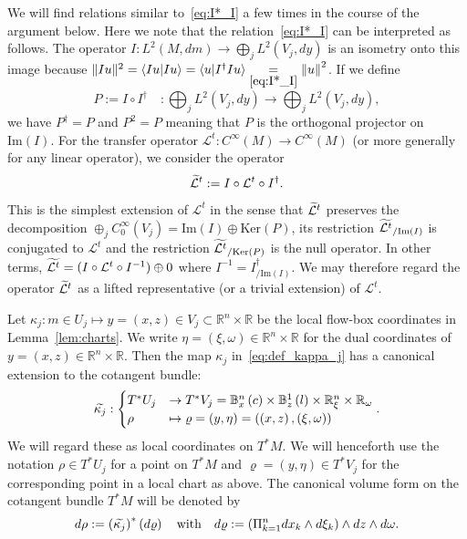\documentclass[AHL,Unicode,longabstracts,published]{cedram}
\newcommand{\clL}{\mathcal{L}}
\newcommand{\Imm}{\mathrm{Im}}
\newcommand{\Kerr}{\mathrm{Ker}}
\newcommand{\bbR}{\mathbb{R}}
\newcommand{\bbB}{\mathbb{B}}
\let\oldtilde\tilde
\renewcommand*{\tilde}[1]{\mathchoice{\widetilde{#1}}{\widetilde{#1}}{\oldtilde{#1}}{\oldtilde{#1}}}
\newcommand{\Imm}{\mathrm{Im}}
\newcommand{\bbR}{\mathbb{R}}
\begin{document}
\begin{rema}\label{rem:Projection}
We will find relations similar to~\eqref{eq:I*_I} a few times in the course of the argument below. Here we note that the relation~\eqref{eq:I*_I} can be interpreted as follows. The operator $I:L^{2}(M,dm)\rightarrow\bigoplus_{j}L^{2}(V_{j},dy)$ is an isometry onto this image because $\Vert Iu\Vert ^{2}=\langle Iu|Iu\rangle=\langle u|I^{\dagger}Iu\rangle\underset{\eqref{eq:I*_I}}{=}\left\Vert u\right\Vert ^{2}$. If we define
\[
P:=I\circ I^{\dagger}\quad:\bigoplus_{j}L^{2}\left(V_{j},dy\right)\rightarrow\bigoplus_{j}L^{2}\left(V_{j},dy\right),
\]
we have $P^{\dagger}=P$ and $P^{2}=P$ meaning that $P$ is the orthogonal projector on $\Imm(I)$. For the transfer operator $\clL^{t}:C^{\infty}(M)\rightarrow C^{\infty}(M)$ (or more generally for any linear operator), we consider the operator
\[
\tilde{\clL}^{t}:=I\circ\clL^{t}\circ I^{\dagger}.
\]
This is the simplest extension of $\clL^{t}$ in the sense that $\tilde{\clL}^{t}$ preserves the decomposition $\oplus_{j}C_{0}^{\infty}(V_{j})=\Imm(I)\oplus\Kerr(P)$, its restriction $\tilde{\clL^{t}}_{/\Imm(I)}$ is conjugated to $\clL^{t}$ and the restriction $\tilde{\clL^{t}}_{/\Kerr(P)}$ is the null operator. In other terms, $\tilde{\clL^{t}}=(I\circ\clL^{t}\circ I^{-1})\oplus0$ where $I^{-1}=I_{/\Imm(I)}^{\dagger}$. We may therefore regard the operator $\tilde{\clL}^{t}$ as a lifted representative (or a trivial extension) of $\clL^{t}$.
\end{rema}

\begin{defi}\label{def:local_charts_on_T*M}
Let $\kappa_{j}:m\in U_{j}\mapsto y=(x,z)\in V_{j}\subset\bbR^{n}\times\bbR$ be the local flow-box coordinates in Lemma~\ref{lem:charts}. We write $\eta=(\xi,\omega)\in\bbR^{n}\times\bbR$ for the dual coordinates of $y=(x,z)\in\bbR^{n}\times\bbR$. Then the map $\kappa_{j}$ in~\eqref{eq:def_kappa_j} has a canonical extension to the cotangent bundle:
\begin{equation}\label{eq:def_k_tilde_j}
\tilde{\kappa_{j}}:
\begin{cases}
T^{*}U_{j} & \rightarrow T^{*}V_{j}=\bbB _{x}^{n}\left(c\right)\times\bbB _{z}^{1}\left(l\right)\times\bbR_{\xi}^{n}\times\bbR_{\omega}\\
\rho & \mapsto\varrho=\left(y,\eta\right)=\left(\left(x,z\right),\left(\xi,\omega\right)\right)
\end{cases}.
\end{equation}
We will regard these as local coordinates on $T^{*}M$. We will henceforth use the notation $\rho\in T^{*}U_{j}$ for a point on $T^{*}M$ and $\varrho=(y,\eta)\in T^{*}V_{j}$ for the corresponding point in a local chart as above. The canonical volume form on the cotangent bundle $T^{*}M$ will be denoted by
\begin{equation}\label{eq:def_d_rho}
d\rho:=\left(\tilde{\kappa_{j}}\right)^{*}\left(d\varrho\right)\quad\text{with}\quad d\varrho:=\left(\Pi_{k=1}^{n}dx_{k}\wedge d\xi_{k}\right)\wedge dz\wedge d\omega.
\end{equation}
\end{defi}
\end{document}

